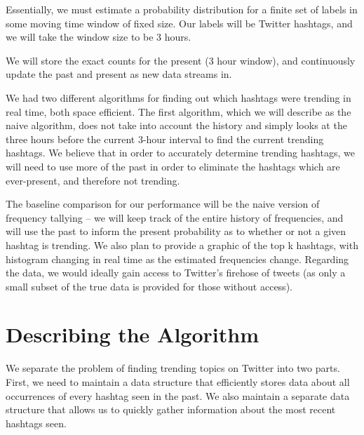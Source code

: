 \documentclass[twoside]{article}
\begin{document}
Essentially, we must estimate a probability distribution for a finite set of labels in some moving time window of fixed size. Our labels will be Twitter hashtags, and we will take the window size to be 3 hours.

We will store the exact counts for the present (3 hour window), and continuously update the past and present as new data streams in. 

We had two different algorithms for finding out which hashtags were trending in real time, both space efficient.
The first algorithm, which we will describe as the naive algorithm, does not take into account the history and simply looks at the three hours before the current $3$-hour interval to find the current trending hashtags. We believe that in order to accurately determine trending hashtags, we will need to use more of the past in order to eliminate the hashtags which are ever-present, and therefore not trending. 


The baseline comparison for our performance will be the naive version of frequency tallying -- we will keep track of the entire history of frequencies, and will use the past to inform the present probability as to whether or not a given hashtag is trending. We also plan to provide a graphic of the top k hashtags, with histogram changing in real time as the estimated frequencies change. Regarding the data, we would ideally gain access to Twitter's firehose of tweets (as only a small subset of the true data is provided for those without access). 

\section{Describing the Algorithm}


We separate the problem of finding trending topics on Twitter into two parts.  First, we need to maintain a data structure that efficiently stores data about all occurrences of every hashtag seen in the past.  We also maintain a separate data structure that allows us to quickly gather information about the most recent hashtags seen.
\end{document}
